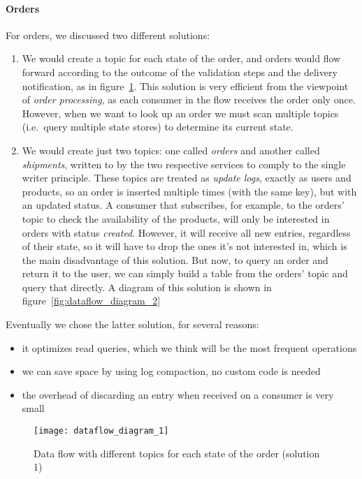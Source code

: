 \paragraph{Orders}
For orders, we discussed two different solutions:
\begin{enumerate}
    \item We would create a topic for each state of the order, and orders would flow forward according to the outcome of the validation steps and the delivery notification, as in figure~\ref{fig:dataflow_diagram_1}. This solution is very efficient from the viewpoint of \emph{order processing}, as each consumer in the flow receives the order only once. However, when we want to look up an order we must scan multiple topics (i.e.\ query multiple state stores) to determine its current state.
    \item We would create just two topics: one called \emph{orders} and another called \emph{shipments}, written to by the two respective services to comply to the single writer principle. These topics are treated as \emph{update logs}, exactly as users and products, so an order is inserted multiple times (with the same key), but with an updated status. A consumer that subscribes, for example, to the orders' topic to check the availability of the products, will only be interested in orders with status \emph{created}. However, it will receive all new entries, regardless of their state, so it will have to drop the ones it's not interested in, which is the main disadvantage of this solution.
          But now, to query an order and return it to the user, we can simply build a table from the orders' topic and query that directly. A diagram of this solution is shown in figure~\ref{fig:dataflow_diagram_2}
\end{enumerate}

Eventually we chose the latter solution, for several reasons:
\begin{itemize}[noitemsep]
    \item it optimizes read queries, which we think will be the most frequent operations
    \item we can save space by using log compaction, no custom code is needed
    \item the overhead of discarding an entry when received on a consumer is very small
\end{itemize}

\begin{figure}[p]
    \centering
    \texttt{[image: dataflow\_diagram\_1]}
    \caption{Data flow with different topics for each state of the order (solution 1)}
    \label{fig:dataflow_diagram_1}
\end{figure}

